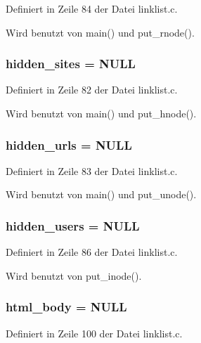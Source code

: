 Definiert in Zeile 84 der Datei linklist.c.

Wird benutzt von main() und put\_\-rnode().
\subsubsection{ {\bf hidden\_\-sites} = NULL}\label{linklist_8c_96bde86b735761b0b2b03d057d7bddfd}




Definiert in Zeile 82 der Datei linklist.c.

Wird benutzt von main() und put\_\-hnode().
\subsubsection{ {\bf hidden\_\-urls} = NULL}\label{linklist_8c_fb86638f144a8726901b06185e2415af}




Definiert in Zeile 83 der Datei linklist.c.

Wird benutzt von main() und put\_\-unode().
\subsubsection{ {\bf hidden\_\-users} = NULL}\label{linklist_8c_c328ffff94e0ce5d57817ee1197767aa}




Definiert in Zeile 86 der Datei linklist.c.

Wird benutzt von put\_\-inode().
\subsubsection{ {\bf html\_\-body} = NULL}\label{linklist_8c_4bb0bd1db8f0b3cc89d509d8c5daddde}




Definiert in Zeile 100 der Datei linklist.c.

